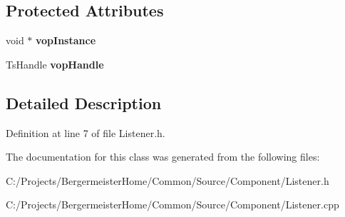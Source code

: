 \subsection*{Protected Attributes}
\begin{DoxyCompactItemize}
\item 
\mbox{\label{class_g_n_common_1_1_g_n_component_1_1_g_tc_listener_aab044fbbc2280b4577d9e8103885c9e0}} 
void $\ast$ {\bfseries vop\+Instance}
\item 
\mbox{\label{class_g_n_common_1_1_g_n_component_1_1_g_tc_listener_a0c5e4d4c379d166023eb2c35b1fae166}} 
Ts\+Handle {\bfseries vop\+Handle}
\end{DoxyCompactItemize}


\subsection{Detailed Description}


Definition at line 7 of file Listener.\+h.



The documentation for this class was generated from the following files\+:\begin{DoxyCompactItemize}
\item 
C\+:/\+Projects/\+Bergermeister\+Home/\+Common/\+Source/\+Component/Listener.\+h\item 
C\+:/\+Projects/\+Bergermeister\+Home/\+Common/\+Source/\+Component/Listener.\+cpp\end{DoxyCompactItemize}
